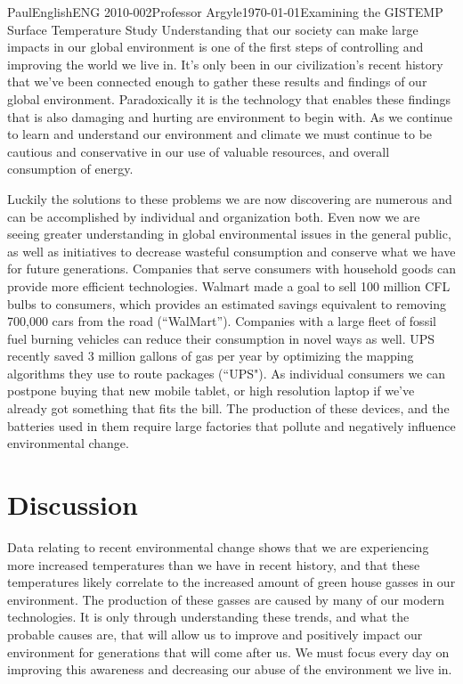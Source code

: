\documentclass[12pt,letterpaper]{article}
\begin{document}
\begin{mla}{Paul}{English}{ENG 2010-002}{Professor Argyle}{\today}{Examining the GISTEMP Surface Temperature Study}
Understanding that our society can make large impacts in our global environment is one of the first steps of controlling and improving the world we live in. It's only been in our civilization's recent history that we've been connected enough to gather these results and findings of our global environment. Paradoxically it is the technology that enables these findings that is also damaging and hurting are environment to begin with. As we continue to learn and understand our environment and climate we must continue to be cautious and conservative in our use of valuable resources, and overall consumption of energy.

Luckily the solutions to these problems we are now discovering are numerous and can be accomplished by individual and organization both. Even now we are seeing greater understanding in global environmental issues in the general public, as well as initiatives to decrease wasteful consumption and conserve what we have for future generations. Companies that serve consumers with household goods can provide more efficient technologies. Walmart made a goal to sell 100 million CFL bulbs to consumers, which provides an estimated savings equivalent to removing 700,000 cars from the road (``WalMart''). Companies with a large fleet of fossil fuel burning vehicles can reduce their consumption in novel ways as well. UPS recently saved 3 million gallons of gas per year by optimizing the mapping algorithms they use to route packages (``UPS"). As individual consumers we can postpone buying that new mobile tablet, or high resolution laptop if we've already got something that fits the bill. The production of these devices, and the batteries used in them require large factories that pollute and negatively influence environmental change.

\section{Discussion}
Data relating to recent environmental change shows that we are experiencing more increased temperatures than we have in recent history, and that these temperatures likely correlate to the increased amount of green house gasses in our environment. The production of these gasses are caused by many of our modern technologies. It is only through understanding these trends, and what the probable causes are, that will allow us to improve and positively impact our environment for generations that will come after us. We must focus every day on improving this awareness and decreasing our abuse of the environment we live in.


\end{mla}
\end{document}
